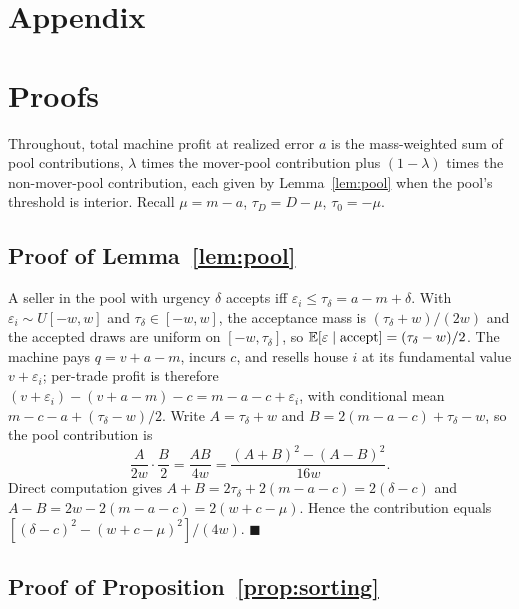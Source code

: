 \clearpage
\appendix
\setcounter{table}{0}
\renewcommand{\thetable}{A\arabic{table}}
\setcounter{figure}{0}
\renewcommand{\thefigure}{A\arabic{figure}}
\setcounter{equation}{0}
\renewcommand{\theequation}{A\arabic{equation}}

\section*{Appendix}

\section{Proofs}\label{app:proofs}

Throughout, total machine profit at realized error $a$ is the mass-weighted sum of pool contributions, $\lambda$ times the mover-pool contribution plus $(1-\lambda)$ times the non-mover-pool contribution, each given by Lemma~\ref{lem:pool} when the pool's threshold is interior. Recall $\mu = m - a$, $\tau_D = D - \mu$, $\tau_0 = -\mu$.

\subsection{Proof of Lemma~\ref{lem:pool}}

A seller in the pool with urgency $\delta$ accepts iff $\varepsilon_i \le \tau_\delta = a - m + \delta$. With $\varepsilon_i \sim U[-w,w]$ and $\tau_\delta \in [-w,w]$, the acceptance mass is $(\tau_\delta + w)/(2w)$ and the accepted draws are uniform on $[-w, \tau_\delta]$, so $\mathbb{E}[\varepsilon \mid \text{accept}] = (\tau_\delta - w)/2$. The machine pays $q = v + a - m$, incurs $c$, and resells house $i$ at its fundamental value $v + \varepsilon_i$; per-trade profit is therefore $(v + \varepsilon_i) - (v + a - m) - c = m - a - c + \varepsilon_i$, with conditional mean $m - c - a + (\tau_\delta - w)/2$. Write $A = \tau_\delta + w$ and $B = 2(m - a - c) + \tau_\delta - w$, so the pool contribution is
\[
\frac{A}{2w} \cdot \frac{B}{2} = \frac{AB}{4w} = \frac{(A+B)^2 - (A-B)^2}{16w}.
\]
Direct computation gives $A + B = 2\tau_\delta + 2(m - a - c) = 2(\delta - c)$ and $A - B = 2w - 2(m - a - c) = 2(w + c - \mu)$. Hence the contribution equals $[(\delta - c)^2 - (w + c - \mu)^2]/(4w)$. $\blacksquare$

\subsection{Proof of Proposition~\ref{prop:sorting}}

